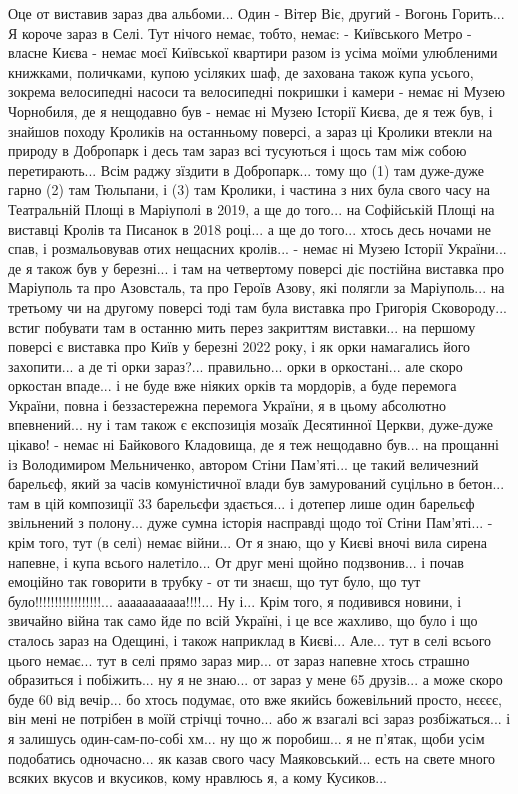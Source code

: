 Оце от виставив зараз два альбоми...
Один - Вітер Віє, другий - Вогонь Горить...
Я короче зараз в Селі. Тут нічого немає, тобто, немає:
- Київського Метро
- власне Києва
- немає моєї Київської квартири разом із усіма моїми улюбленими книжками, поличками, купою усіляких шаф,
де захована також купа усього, зокрема велосипедні насоси та велосипедні покришки і камери
- немає ні Музею Чорнобиля, де я нещодавно був
- немає ні Музею Історії Києва, де я теж був, і знайшов походу
Кроликів на останньому поверсі, а зараз ці Кролики втекли на природу в Добропарк і десь там зараз всі тусуються і щось там між собою перетирають... Всім раджу зїздити в Добропарк... тому що (1) там дуже-дуже гарно (2) там Тюльпани, і (3) там Кролики, і частина з них була свого часу на Театральній Площі в Маріуполі в 2019, а ще до того... на Софійській Площі на виставці Кролів та Писанок в 2018 році... а ще до того... хтось десь ночами не спав, і розмальовував отих нещасних кролів...
- немає ні Музею Історії України... де я також був у березні... і там на четвертому поверсі діє постійна виставка про Маріуполь та про Азовсталь, та про Героїв Азову, які полягли за Маріуполь... на третьому чи на другому поверсі тоді там  була виставка про Григорія Сковороду... встиг побувати там в останню мить перез закриттям виставки... на першому поверсі є виставка про Київ у березні 2022 року, і як орки намагались його захопити... а де ті орки зараз?...
правильно... орки в оркостані... але скоро оркостан впаде... і не буде вже ніяких орків та мордорів, а буде перемога України, повна і беззастережна перемога України, я в цьому абсолютно впевнений... ну і там також є експозиція мозаїк Десятинної Церкви, дуже-дуже цікаво!
- немає ні Байкового Кладовища, де я теж нещодавно був... 
на прощанні із Володимиром Мельниченко, автором Стіни Пам'яті... це такий величезний барельєф, який за часів комуністичної влади був замурований суцільно в бетон... там в цій композиції 33 барельєфи здається... і дотепер лише один барельєф звільнений з полону... дуже сумна історія насправді щодо тої Стіни Пам'яті...
- крім того, тут (в селі) немає війни... От я знаю, що у Києві вночі вила сирена напевне, і купа всього налетіло... От друг мені щойно подзвонив... і почав емоційно так говорити в трубку - от ти знаєш, що тут було, що тут було!!!!!!!!!!!!!!!!!... ааааааааааа!!!!... Ну і... Крім того, я подивився новини, і звичайно війна так само йде по всій Україні, і це все жахливо, що було і що сталось зараз на Одещині, і також наприклад в Києві... Але... тут в селі всього цього немає... тут в селі прямо зараз мир... от зараз напевне хтось страшно образиться і побіжить... ну я не знаю... от зараз у мене 65 друзів... а може скоро буде 60 від вечір... бо хтось подумає, ото вже якийсь божевільний просто, нєєєє, він мені не потрібен в моїй стрічці точно... або ж взагалі всі зараз розбіжаться... і я залишусь один-сам-по-собі хм... ну що ж поробиш... я не п'ятак, щоби усім подобатись одночасно... як казав свого часу Маяковський... есть на свете много всяких вкусов и вкусиков, кому нравлюсь я, а кому Кусиков...
